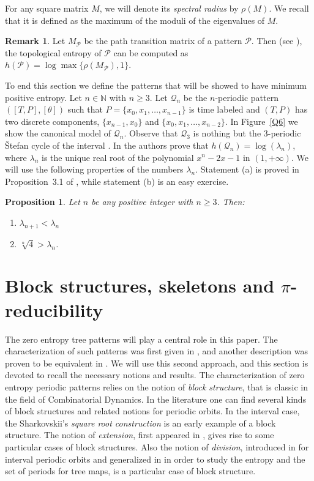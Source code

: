 \documentclass[a4paper]{amsart}
\newtheorem{proposition}[theorem]{Proposition}
\theoremstyle{definition}
\newtheorem{remark}[theorem]{Remark}
\begin{document}
For any square matrix $M$, we will denote its \emph{spectral radius}
by $\rho(M)$. We recall that it is defined as the maximum of the
moduli of the eigenvalues of $M$.

\begin{remark}\label{patent}
Let $M_{\mathcal{P}}$ be the path transition matrix of a pattern $\mathcal{P}$. Then (see \cite{aglmm}), the topological
entropy of $\mathcal{P}$ can be computed as $h(\mathcal{P})=\log\max\{\rho(M_{\mathcal{P}}),1\}$.
\end{remark}

\label{qn}
To end this section we define the patterns that will be showed to have minimum positive entropy. Let $n\in\mathbb{N}$
with $n\ge3$. Let $\mathcal{Q}_n$ be the $n$-periodic pattern $([T,P],[\theta])$ such that $P=\{x_0,x_1,\ldots,x_{n-1}\}$
is time labeled and $(T,P)$ has two discrete components, $\{x_{n-1},x_0\}$ and $\{x_0,x_1,\ldots,x_{n-2}\}$. In Figure~\ref{Q6}
we show the canonical model of $\mathcal{Q}_n$. Observe that $\mathcal{Q}_3$ is nothing but the
3-periodic \v{S}tefan cycle of the interval \cite{ste}. In \cite{ajm} the authors prove that $h(\mathcal{Q}_n)=\log(\lambda_n)$, where
$\lambda_n$ is the unique real root of the polynomial $x^n-2x-1$ in $(1,+\infty)$. We will use the following properties of the
numbers $\lambda_n$. Statement (a) is proved in Proposition~3.1 of \cite{ajm}, while statement (b) is an easy exercise.

\begin{proposition}\label{propietats}
Let $n$ be any positive integer with $n\ge 3$. Then:
\begin{enumerate}
\item $\lambda_{n+1}<\lambda_n$
\item $\sqrt[n]{4}>\lambda_n$.
\end{enumerate}
\end{proposition}


\section{Block structures, skeletons and $\pi$-reducibility}\label{S3}
The zero entropy tree patterns will play a central role in this paper. The characterization
of such patterns was first given in \cite{aglmm}, and another description was proven
to be equivalent in \cite{reducibility}. We will use this second approach, and this section is devoted
to recall the necessary notions and results. The characterization of zero entropy periodic patterns
relies on the notion of \emph{block structure}, that is classic in the field of Combinatorial Dynamics. In
the literature one can find several kinds of block structures and related notions for periodic orbits.
In the interval case, the Sharkovskii's \emph{square root construction} \cite{shar} is an early example
of a block structure. The notion of \emph{extension}, first appeared in \cite{block2}, gives
rise to some particular cases of block structures. Also the notion of \emph{division},
introduced in \cite{lmpy} for interval periodic orbits and generalized in \cite{ay1} in order to study the
entropy and the set of periods for tree maps, is a particular case of block structure.
\end{document}
